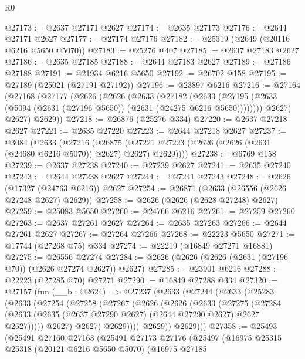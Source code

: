\begin{lexlean}{R0}
\begin{coremodule}
@27173 := @2637 @27171 @2627
@27174 := @2635 @27173
@27176 := @2644 @27171 @2627
@27177 := @27174 @27176
@27182 := @25319 (@2649 (@20116 @6216 @5650 @5070))
@27183 := @25276 @407
@27185 := @2637 @27183 @2627
@27186 := @2635 @27185
@27188 := @2644 @27183 @2627
@27189 := @27186 @27188
@27191 := @21934 @6216 @5650
@27192 := @26702 @158
@27195 := @27189 (@25021 (@27191 @27192))
@27196 := @23897 @6216
@27216 := @27164
    (@27168
      (@27177
        (@2626
          (@2626
            (@2633
              (@27182
                (@2633
                  (@27195 (@2633 (@5094 (@2631 (@27196 @5650)) (@2631 (@24275 @6216 @5650))))))))
            @2627)
          @2627)
        @2629))
@27218 := @26876 (@25276 @334)
@27220 := @2637 @27218 @2627
@27221 := @2635 @27220
@27223 := @2644 @27218 @2627
@27237 := @3084
    (@2633
      (@27216
        (@26875 (@27221 @27223 (@2626 (@2626 (@2631 (@24680 @6216 @5070)) @2627) @2627) @2629))))
@27238 := @6769 @158
@27239 := @2637 @27238
@27240 := @27239 @2627
@27241 := @2635 @27240
@27243 := @2644 @27238 @2627
@27244 := @27241 @27243
@27248 := @2626 (@17327 (@24763 @6216)) @2627
@27254 := @26871 (@2633 (@26556 (@2626 @27248 @2627) @2629))
@27258 := @2626 (@2626 (@2628 @27248) @2627)
@27259 := @25083 @5650
@27260 := @24766 @6216
@27261 := @27259 @27260
@27263 := @2637 @27261 @2627
@27264 := @2635 @27263
@27266 := @2644 @27261 @2627
@27267 := @27264 @27266
@27268 := @22223 @5650
@27271 := @17744 (@27268 @75) @334
@27274 := @22219 (@16849 @27271 @16881)
@27275 := @26556 @27274
@27284 := @2626 (@2626 (@2626 (@2631 (@27196 @70)) (@2626 @27274 @2627)) @2627)
@27285 := @23901 @6216
@27288 := @22223 (@27285 @70) @27271
@27290 := @16849 @27288 @334
@27320 := @27157
    (fun (__b : @2624) =>
    @27237
      (@2633
        (@27244
          (@2633
            (@25283
              (@2633
                (@27254
                  (@27258
                    (@27267
                      (@2626
                        (@2626
                          (@2633
                            (@27275
                              (@27284
                                (@2633
                                  (@2635 (@2637 @27290 @2627) (@2644 @27290 @2627) @2627 @2627)))))
                          @2627)
                        @2627)
                      @2629))))
              @2629))
          @2629)))
@27358 := @25493
    (@25491
      @27160
      @27163
      (@25491
        @27173
        @27176
        (@25497
          (@16975
            @25315
            @25318
            (@20121 @6216 @5650 @5070)
            (@16975
              @27185

\end{coremodule}
\end{lexlean}
